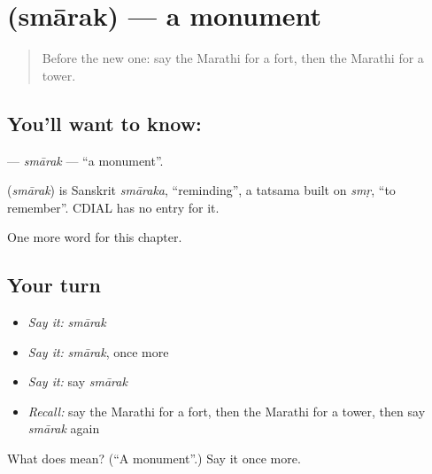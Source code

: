 \section[\texorpdfstring{\mr{स्मारक} (smārak)}{स्मारक (smārak)}]{ (smārak) — a monument}

\label{lesson:MR-C183-smarak}



\begin{quote}
Before the new one: say the Marathi for a fort, then the Marathi for a tower.
\end{quote}

\subsection*{You'll want to know: }
\textbf{} — \emph{smārak} — \textquotedblleft{}a monument\textquotedblright{}.

\begin{cousinweb}
\textbf{} (\emph{smārak}) is Sanskrit \emph{smāraka}, \textquotedblleft{}reminding\textquotedblright{}, a tatsama built on \emph{smṛ}, \textquotedblleft{}to remember\textquotedblright{}. CDIAL has no entry for it.
\end{cousinweb}

\begin{grammarlens}[title={What you've built}]
One more word for this chapter.
\end{grammarlens}

\subsection*{Your turn}
\begin{itemize}
\raggedright
  \item \emph{Say it:} \emph{smārak}
  \item \emph{Say it:} \emph{smārak}, once more
  \item \emph{Say it:} say \emph{smārak}
  \item \emph{Recall:} say the Marathi for a fort, then the Marathi for a tower, then say \emph{smārak} again
\end{itemize}

\begin{tcolorbox}[breakable,colback=teal!4,colframe=teal!35!black,title={Before you move on}]
What does  mean? (\textquotedblleft{}A monument\textquotedblright{}.) Say it once more.
\end{tcolorbox}
